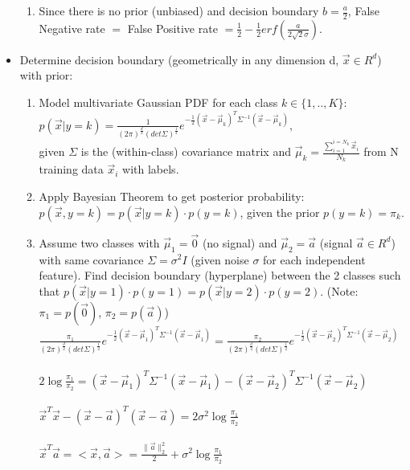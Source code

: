 \documentclass[11pt]{article}
\begin{document}
\begin{itemize}
\begin{enumerate}
    \item Since there is no prior (unbiased) and decision boundary $b=\frac{a}{2}$, False Negative rate $=$ False Positive rate $= \frac{1}{2} - \frac{1}{2} erf(\frac{a}{2\sqrt{2}\sigma})$.
\end{enumerate}

\item Determine decision boundary (geometrically in any dimension d, $\vec{x} \in R^d$) with prior:
\begin{enumerate}
    \item Model multivariate Gaussian PDF for each class $k \in \{1,..,K\}$:\\
    $p(\vec{x}|y=k) = \frac{1}{{(2\pi)}^{\frac{d}{2}} {(det\Sigma)}^{\frac{1}{2}}} e^{-\frac{1}{2}{(\vec{x}-\vec{\mu}_k)}^T \Sigma^{-1}{(\vec{x}-\vec{\mu}_k)}}$,\\
    given $\Sigma$ is the (within-class) covariance matrix and $\vec{\mu}_k = \frac{\sum_{i=1}^{i=N_k} \vec{x}_i}{N_k}$ from N training data $\vec{x}_i$ with labels. 
    \item Apply Bayesian Theorem to get posterior probability: $p(\vec{x}, y=k) = p(\vec{x}|y=k) \cdot p(y=k)$, given the prior $p(y=k) = \pi_k$.
    \item Assume two classes with $\vec{\mu}_1 = \vec{0}$ (no signal) and $\vec{\mu}_2 = \vec{a}$ (signal $\vec{a} \in R^d$) with same covariance $\Sigma = \sigma^2 I$ (given noise $\sigma$ for each independent feature). Find decision boundary (hyperplane) between the 2 classes such that $p(\vec{x}|y=1)\cdot p(y=1) = p(\vec{x}|y=2)\cdot p(y=2)$. (Note: $\pi_1 = p(\vec{0})$, $\pi_2 = p(\vec{a})$)\\
    $\frac{\pi_1}{{(2\pi)}^{\frac{d}{2}} {(det\Sigma)}^{\frac{1}{2}}} e^{-\frac{1}{2}{(\vec{x}-\vec{\mu}_1)}^T \Sigma^{-1}{(\vec{x}-\vec{\mu}_1)}} = \frac{\pi_2}{{(2\pi)}^{\frac{d}{2}} {(det\Sigma)}^{\frac{1}{2}}} e^{-\frac{1}{2}{(\vec{x}-\vec{\mu}_2)}^T \Sigma^{-1}{(\vec{x}-\vec{\mu}_2)}}$ \\\\
    $2\log{\frac{\pi_1}{\pi_2}} = {(\vec{x}-\vec{\mu}_1)}^T \Sigma^{-1}{(\vec{x}-\vec{\mu}_1)} - {(\vec{x}-\vec{\mu}_2)}^T \Sigma^{-1}{(\vec{x}-\vec{\mu}_2)}$\\\\
    $\vec{x}^T\vec{x} - {(\vec{x}-\vec{a})}^T(\vec{x}-\vec{a}) = 2\sigma^2\log{\frac{\pi_1}{\pi_2}}$\\\\
    $\vec{x}^T\vec{a} = <\vec{x}, \vec{a}> = \frac{\lVert \vec{a} \rVert_2^2}{2} + \sigma^2\log{\frac{\pi_1}{\pi_2}}$

\end{enumerate}
\end{itemize}
\end{document}
